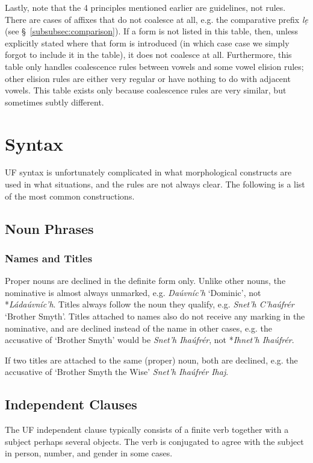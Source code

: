 \documentclass[a4paper, 12pt, twoside, final]{article}
\let \w \textit
\begin{document}
\noindent Lastly, note that the 4 principles mentioned earlier are guidelines, not rules. There are cases of affixes that do not coalesce
at all, e.g. the comparative prefix \w{lẹ} (see §~\ref{subsubsec:comparison}). If a form is not listed in this table, then,
unless explicitly stated where that form is introduced (in which case case we simply forgot to include it in the table),
it does not coalesce at all. Furthermore, this table only handles coalescence rules between vowels and some vowel elision rules; other
elision rules are either very regular or have nothing to do with adjacent vowels. This table exists only because coalescence rules are
very similar, but sometimes subtly different.

\section{Syntax}\label{sec:syntax}
UF syntax is unfortunately complicated in what morphological constructs are used in what situations, and
the rules are not always clear. The following is a list of the most common constructions.

\subsection{Noun Phrases}
\subsubsection{Names and Titles}\label{subsubsec:names-and-titles}
Proper nouns are declined in the definite form only. Unlike other nouns, the nominative is almost always
unmarked, e.g. \w{Daúvníc’h} ‘Dominic’, not *\w{Ládaúvníc’h}. Titles always follow the noun they qualify,
e.g. \w{Snet’h C’haúfrér} ‘Brother Smyth’. Titles attached to names also do not receive any marking in the
nominative, and are declined instead of the name in other cases, e.g. the accusative of ‘Brother Smyth’
would be \w{Snet’h Ihaúfrér}, not *\w{Ihnet’h Ihaúfrér}.

If two titles are attached to the same (proper) noun, both are declined, e.g. the accusative of
‘Brother Smyth the Wise’ \w{Snet’h Ihaúfrér Ihaj}.

\subsection{Independent Clauses}
The UF independent clause typically consists of a finite verb together with a subject perhaps several
objects. The verb is conjugated to agree with the subject in person, number, and gender in some cases.
\end{document}
